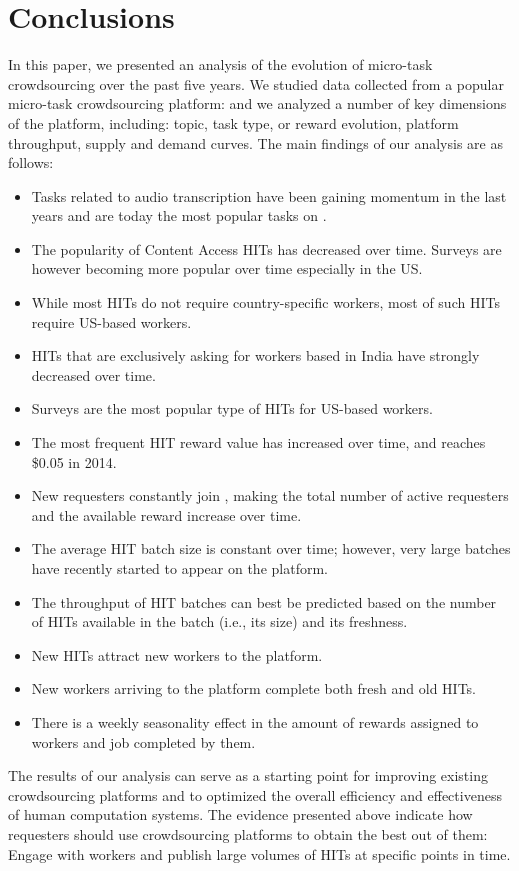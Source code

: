 \section{Conclusions}\label{sec:conc}

In this paper, we presented an analysis of the evolution of micro-task crowdsourcing over the past five years.
We studied data collected from a popular micro-task crowdsourcing platform: \amt{}
and we analyzed a number of key dimensions of the platform, including: topic, task type, or reward evolution, platform throughput, supply and demand curves.
The main findings of our analysis are as follows:
\begin{itemize}[noitemsep,topsep=0pt,parsep=0pt,partopsep=0pt]
	\item Tasks related to audio transcription have been gaining momentum in the last years and are today the most popular tasks on \amt{}.
	\item The popularity of Content Access HITs has decreased over time. Surveys are however becoming more popular over time especially in the US.
	\item While most HITs do not require country-specific workers, most of such HITs require US-based workers.
	\item HITs that are exclusively asking for workers based in India have strongly decreased over time.
	\item Surveys are the most popular type of HITs for US-based workers.
	\item The most frequent HIT reward value has increased over time, and reaches \$0.05 in 2014.
	\item New requesters constantly join \amt{}, making the total number of active requesters and the available reward increase over time.
	\item The average HIT batch size is constant over time; however, very large batches have recently started to appear on the platform.
	\item The throughput of HIT batches can best be predicted based on the number of HITs available in the batch (i.e., its size) and its freshness.
	\item New HITs attract new workers to the platform.
	\item New workers arriving to the platform complete both fresh and old HITs.
	\item There is a weekly seasonality effect in the amount of rewards assigned to workers and job completed by them.
\end{itemize}

The results of our analysis can serve as a starting point for improving existing crowdsourcing platforms and to optimized the overall efficiency and effectiveness of human computation systems. The evidence presented above  indicate how requesters should use crowdsourcing platforms to obtain the best out of them: Engage with workers and publish large volumes of HITs at specific points in time. 

